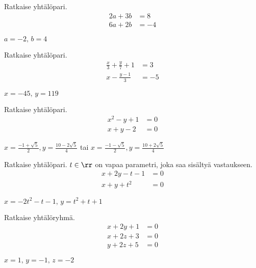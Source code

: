 \begin{tehtavasivu}
\begin{tehtava}
    Ratkaise yhtälöpari.
    \begin{align*}
        2a+3b &= 8 \\
        6a+2b &= -4
    \end{align*}
    \begin{vastaus}
        $a = -2, \, b = 4$
    \end{vastaus}
\end{tehtava}

\begin{tehtava}
    Ratkaise yhtälöpari.
    \begin{align*}
        \frac{x}{3}+\frac{y}{7} + 1 &= 3 \\
        x - \frac{y-1}{3} &= -5
    \end{align*}
    \begin{vastaus}
        $x = -45, \, y = 119$
    \end{vastaus}
\end{tehtava}

\begin{tehtava}
	Ratkaise yhtälöpari.
	\begin{align*}
		x^2-y+1 &= 0 \\
		x+y-2 &= 0
	\end{align*}
	\begin{vastaus}
		$x = \frac{-1+\sqrt{5}}{2}, y = \frac{10-2\sqrt{5}}{4}$ tai $x = \frac{-1-\sqrt{5}}{2}, y = \frac{10+2\sqrt{5}}{4}$
	\end{vastaus}
\end{tehtava}

\begin{tehtava}
    Ratkaise yhtälöpari. $t \in \rr$ on vapaa parametri, joka saa sisältyä vastaukseen.
    \begin{align*}
        x+2y-t-1 &= 0 \\
        x+y+t^2 &=0
    \end{align*}
    \begin{vastaus}
        $x = -2t^2-t-1, \, y = t^2+t+1$
    \end{vastaus}
\end{tehtava}

\begin{tehtava}
    Ratkaise yhtälöryhmä.   
    \begin{align*}
        x+2y+1 &=0 \\
        x+2z+3 &=0 \\
        y+2z+5 &=0
    \end{align*}
    \begin{vastaus}
        $x = 1, \, y = -1, \, z = -2$
    \end{vastaus}
\end{tehtava}


\end{tehtavasivu}
